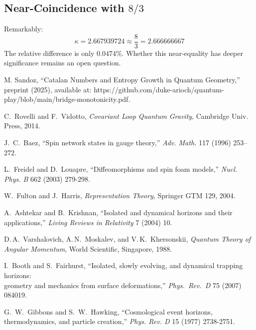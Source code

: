 \documentclass[11pt]{article}
\begin{document}
\subsection{Near-Coincidence with $8/3$}

Remarkably:
\begin{equation}
  \kappa = 2.667939724 \approx \frac{8}{3} = 2.666666667
\end{equation}
The relative difference is only $0.0474\%$. Whether this near-equality has deeper significance remains an open question.


\begin{thebibliography}{8}

  M. Sandoz, ``Catalan Numbers and Entropy Growth in Quantum Geometry,''
  preprint (2025), available at: https://github.com/duke-arioch/quantum-play/blob/main/bridge-monotonicity.pdf.

   C.~Rovelli and F.~Vidotto, \emph{Covariant Loop Quantum Gravity}, Cambridge Univ. Press, 2014.

   J.~C.~Baez, “Spin network states in gauge theory,” \emph{Adv. Math.} 117 (1996) 253–272.

   L.~Freidel and D.~Louapre, ``Diffeomorphisms and spin foam models,'' \emph{Nucl. Phys. B} 662 (2003) 279-298.

   W.~Fulton and J.~Harris, \emph{Representation Theory}, Springer GTM 129, 2004.

   A.~Ashtekar and B.~Krishnan, “Isolated and dynamical horizons and their applications,” \emph{Living Reviews in Relativity} 7 (2004) 10.

  D.\,A.~Varshalovich, A.\,N.~Moskalev, and V.\,K.~Khersonskii,
  \emph{Quantum Theory of Angular Momentum},
  World Scientific, Singapore, 1988.

  I.~Booth and S.~Fairhurst, “Isolated, slowly evolving, and dynamical trapping horizons:\\
  geometry and mechanics from surface deformations,”
  \emph{Phys.\ Rev.\ D} 75 (2007) 084019.

  G.~W.~Gibbons and S.~W.~Hawking, “Cosmological event horizons, thermodynamics, and particle creation,”
  \emph{Phys. Rev. D} 15 (1977) 2738-2751.


\end{thebibliography}
\end{document}
